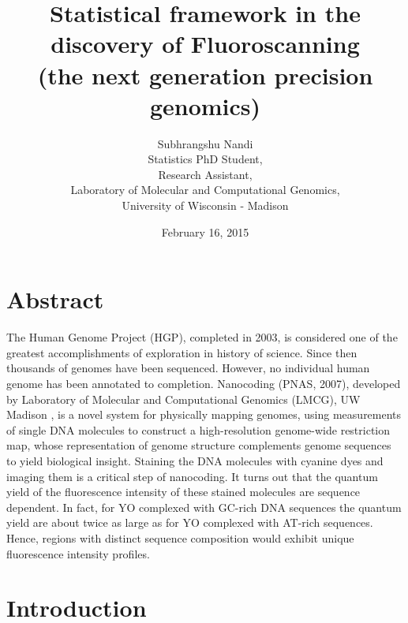 \documentclass[11pt]{extarticle} %
\begin{document}

\title{Statistical framework in the discovery of Fluoroscanning \\ (the next generation precision genomics)}
\author{{\Large{Subhrangshu Nandi}}\\
  Statistics PhD Student, \\
  Research Assistant, \\
  Laboratory of Molecular and Computational Genomics, \\
  University of Wisconsin - Madison}
\date{February 16, 2015}

\maketitle

\section*{Abstract}
The Human Genome Project (HGP), completed in 2003, is considered one of the greatest accomplishments of exploration in history of science. Since then thousands of genomes have been sequenced. However, no individual human genome has been annotated to completion. Nanocoding \cite{Jo_etal_2007_PNAS} (PNAS, 2007), developed by Laboratory of Molecular and Computational Genomics (LMCG), UW Madison , is a novel system for physically mapping genomes, using measurements of single DNA molecules to construct a high-resolution genome-wide restriction map, whose representation of genome structure complements genome sequences to yield biological insight. Staining the DNA molecules with cyanine dyes and imaging them is a critical step of nanocoding. It turns out that the quantum yield of the fluorescence intensity of these stained molecules are sequence dependent. In fact, for YO complexed with GC-rich DNA sequences the quantum yield are about twice as large as for YO complexed with AT-rich sequences. Hence, regions with distinct sequence composition would exhibit unique fluorescence intensity profiles. 

\newpage

\tableofcontents
\newpage

\newpage

\section{Introduction}
\end{document}
